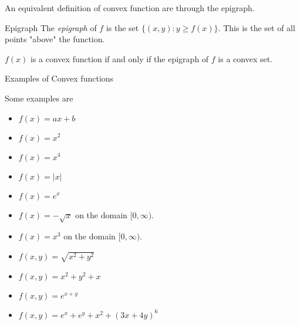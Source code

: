 \begin{figure}[H]


\end{figure}



An equivalent definition of convex function are through the epigraph.

\begin{definition}{Epigraph}{}
The \emph{epigraph} of $f$ is the set $\{(x,y) : y \geq f(x)\}$.  This is the set of all points "above" the function.
\end{definition}

\begin{theorem}{}{}
$f(x)$ is a convex function if and only if the epigraph of $f$ is a convex set.
\end{theorem}

\footnotemark




\begin{example}{Examples of Convex functions}{}

Some examples are 

\begin{itemize}
\item $f(x) = ax + b$
\item $f(x) = x^2$
\item $f(x) = x^4$
\item $f(x) = |x|$
\item $f(x) = e^x$
\item $f(x) = - \sqrt{x}$ on the domain $[0,\infty)$.
\item $f(x) = x^3$ on the domain $[0,\infty)$.
\item $f(x,y) = 
\sqrt{x^2 + y^2}$
\item $f(x,y) = x^2 + y^2 + x$
\item $ f(x,y) = e^{x+y}$
\item $f(x,y) = e^{x} + e^{y} + x^2+  (3x + 4y)^6$
\end{itemize}

\end{example}






